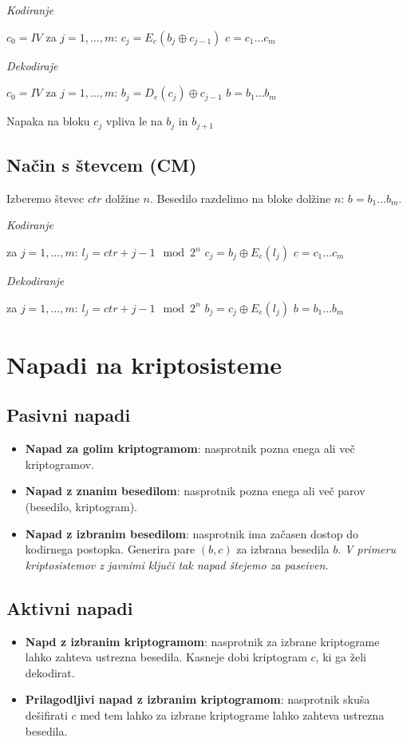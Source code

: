 \begin{multicols}{5}
\textit{Kodiranje}
\begin{koda}
$c_0 = IV$
za $j = 1, \dots, m$:
	$c_j = E_e(b_j \oplus c_{j-1})$
$c = c_1  \dots c_m$
\end{koda}

\textit{Dekodiraje}
\begin{koda}
$c_0 = IV$
za $j = 1, \dots, m$:
	$b_j = D_e(c_j) \oplus c_{j-1}$
$b = b_1  \dots b_m$
\end{koda}

Napaka na bloku $c_j$ vpliva le na $b_j$ in $b_{j+1}$

\subsection*{Način s števcem (CM)}
Izberemo števec $ctr$ dolžine $n$. Besedilo razdelimo na bloke dolžine $n$: $b = b_1 \dots b_m$.

\textit{Kodiranje}
\begin{koda}
za $ j = 1, \dots, m$:
	$l_j = ctr + j - 1 \mod 2^n$
	$c_j = b_j \oplus E_e(l_j)$
$c = c_1 \dots c_m$
\end{koda}

\textit{Dekodiranje}
\begin{koda}
za $ j = 1, \dots, m$:
	$l_j = ctr + j - 1 \mod 2^n$
	$b_j = c_j \oplus E_e(l_j)$
$b = b_1 \dots b_m$
\end{koda}

\section*{Napadi na kriptosisteme}
\subsection*{Pasivni napadi}
\begin{itemize}
	\item \textbf{Napad za golim kriptogramom}: nasprotnik pozna enega ali več kriptogramov.
	\item \textbf{Napad z znanim besedilom}: nasprotnik pozna enega ali več parov (besedilo, kriptogram).
	\item \textbf{Napad z izbranim besedilom}: nasprotnik ima začasen dostop do kodirnega postopka. Generira pare $(b,c)$ za izbrana besedila $b$. \textit{V primeru kriptosistemov z javnimi ključi tak napad štejemo za paseiven.}
\end{itemize}

\subsection*{Aktivni napadi}
\begin{itemize}
	\item \textbf{Napd z izbranim kriptogramom}: nasprotnik za izbrane kriptograme lahko zahteva ustrezna besedila. Kasneje dobi kriptogram $c$, ki ga želi dekodirat.
	\item \textbf{Prilagodljivi napad z izbranim kriptogramom}: nasprotnik skuša dešifirati $c$ med tem lahko za izbrane kriptograme lahko zahteva ustrezna besedila.
\end{itemize}


\end{multicols}
